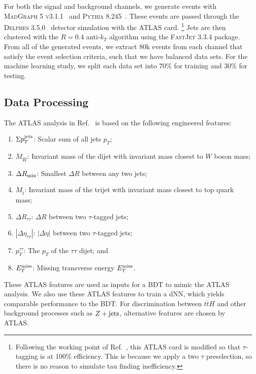 \documentclass[aps,prd,twocolumn,superscriptaddress,floatfix,longbibliography,preprintnumbers,nofootinbib]{revtex4-1} %
\DeclareRobustCommand{\RRef}[1]{Ref.~\cite{#1}}
\newcounter{para}
\begin{document}
For both the signal and background channels, we generate events with \textsc{MadGraph 5 v3.1.1}~\cite{Alwall:2011uj} and \textsc{Pythia 8.245}~\cite{Sjostrand:2014zea}.
%
These events are passed through the \textsc{Delphes 3.5.0}~\cite{deFavereau:2013fsa} detector simulation with the ATLAS card.%
%
\footnote{Following the working point of \RRef{ATLAS:2022yrq}, this ATLAS card is modified so that $\tau$-tagging is at 100\% efficiency.  This is because we apply a two $\tau$ preselection, so there is no reason to simulate tau finding inefficiency.}
%
Jets are then clustered with the $R=0.4$ anti-$k_T$ algorithm \cite{Cacciari:2008gp} using the \textsc{FastJet 3.3.4} \cite{Cacciari:2011ma} package.
%
From all of the generated events, we extract 80k events from each channel that satisfy the event selection criteria, such that we have balanced data sets.
%
For the machine learning study, we split each data set into \(70\%\) for training and \(30\%\) for testing.



\subsection{Data Processing}
\label{sec:process}


The ATLAS analysis in \RRef{ATLAS:2022yrq} is based on the following engineered features:
%
\begin{enumerate}
  \item \(\Sigma p_T^{\rm jets}\): Scalar sum of all jets $p_T$;
  \item \(M_{\hat{W}}\): Invariant mass of the dijet with invariant mass closest to $W$ boson mass;
  \item \(\Delta R_{\rm min}\): Smallest $\Delta R$ between any two jets;
  \item \(M_{\hat{t}}\): Invariant mass of the trijet with invariant mass closest to top quark mass;
  \item \(\Delta R_{\tau\tau}\): $\Delta R$ between two $\tau$-tagged jets;
  \item \(|\Delta \eta_{\tau\tau}|\): $|\Delta \eta|$ between two $\tau$-tagged jets;
  \item \(p_T^{\tau\tau}\): The $p_T$ of the $\tau\tau$ dijet; and
  \item \(E_T^{\rm miss}\): Missing transverse energy $E_T^{\rm miss}$.
\end{enumerate}
%
These ATLAS features are used as inputs for a BDT to mimic the ATLAS analysis.
%
We also use these ATLAS features to train a dNN, which yields comparable performance to the BDT.
% 
For discrimination between \(t\overline{t}H\) and other background processes such as \(Z+{\rm jets}\), alternative features are chosen by ATLAS.
\end{document}
